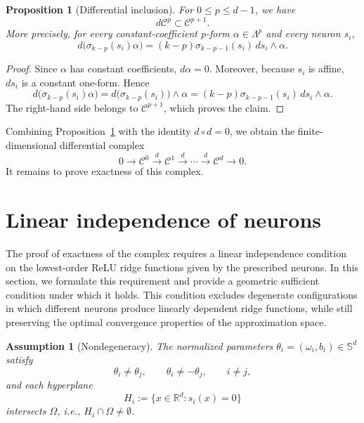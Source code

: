 \documentclass[pdflatex,sn-mathphys-num]{sn-jnl}
\newtheorem{proposition}[theorem]{Proposition}
\newtheorem{assumption}[theorem]{Assumption}
\numberwithin{equation}{section}
\numberwithin{theorem}{section}
\numberwithin{table}{section}
\numberwithin{figure}{section}
\begin{document}
\begin{proposition}[Differential inclusion]\label{prop:inclusion}
For $0\le p\le d-1$, we have
\begin{equation}
d\mathcal C^p\subset \mathcal C^{p+1}.
\end{equation}
More precisely, for every constant-coefficient $p$-form
$\alpha\in\Lambda^p$ and every neuron $s_i$,
\begin{equation}
d\bigl(\sigma_{k-p}(s_i)\alpha\bigr)
=
(k-p)\sigma_{k-p-1}(s_i)\,ds_i\wedge\alpha .
\end{equation}
\end{proposition}

\begin{proof}
Since $\alpha$ has constant coefficients, $d\alpha=0$. Moreover, because
$s_i$ is affine, $ds_i$ is a constant one-form. Hence
\begin{equation}
d\bigl(\sigma_{k-p}(s_i)\alpha\bigr)
=
d\bigl(\sigma_{k-p}(s_i)\bigr)\wedge\alpha
=
(k-p)\sigma_{k-p-1}(s_i)\,ds_i\wedge\alpha .
\end{equation}
The right-hand side belongs to $\mathcal C^{p+1}$, which proves the claim.
\end{proof}

Combining Proposition~\ref{prop:inclusion} with the identity $d\circ d=0$,
we obtain the finite-dimensional differential complex
\begin{equation}\label{eq:relu-complex}
0
\longrightarrow \mathcal C^0
\xrightarrow{d} \mathcal C^1
\xrightarrow{d}
\cdots
\xrightarrow{d} \mathcal C^d
\longrightarrow 0 .
\end{equation}
It remains to prove exactness of this complex.

\section{Linear independence of neurons}\label{sec:independence}
The proof of exactness of the complex requires a linear independence condition on the lowest-order ReLU ridge functions given by the prescribed neurons. In this section, we formulate this requirement and provide a geometric sufficient condition under which it holds. This condition excludes degenerate configurations in which different neurons produce linearly dependent ridge functions, while still preserving the optimal convergence properties of the approximation space.

\begin{assumption}[Nondegeneracy]\label{asm:nondegeneracy}
    The normalized parameters $\theta_i=(\omega_i,b_i)\in\mathbb S ^d$ satisfy
    \begin{equation}
    \theta_i\neq \theta_j,
    \qquad
    \theta_i\neq -\theta_j,
    \qquad i\neq j,
    \end{equation}
    and each hyperplane
    \begin{equation}
    H_i:=\{x\in\mathbb R^d:s_i(x)=0\}
    \end{equation}
    intersects $\Omega$, i.e., $H_i\cap\Omega\neq \emptyset$.
\end{assumption}
\end{document}
